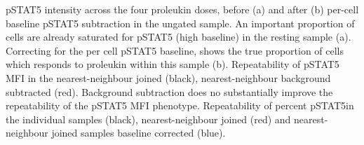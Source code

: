 %
%
{ pSTAT5 intensity across the four proleukin doses, before (a) and after (b) per-cell baseline pSTAT5 subtraction in the ungated sample.}
{
  An important proportion of cells are already saturated for pSTAT5 (high baseline) in the resting sample (a).
  Correcting for the per cell pSTAT5 baseline, shows the true proportion of cells which responds to proleukin within this sample (b).
}
%
{ Repeatability of pSTAT5 MFI in the nearest-neighbour joined (black), nearest-neighbour background subtracted (red). }
{
  Background subtraction does no substantially improve the repeatability of the pSTAT5 MFI phenotype.
}
%
{ Repeatability of percent pSTAT5\positive in the individual samples (black), nearest-neighbour joined (red) and nearest-neighbour joined samples baseline corrected (blue). }
{
}
%
